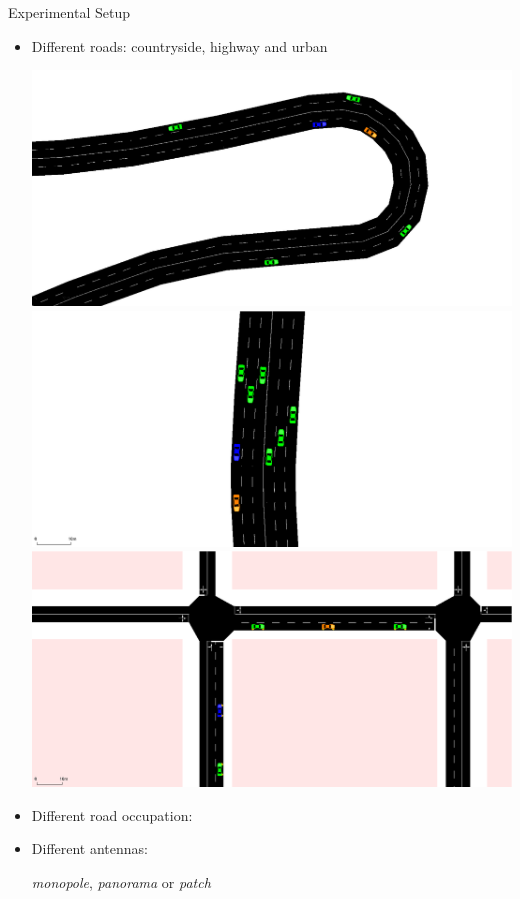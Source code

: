 \documentclass[aspectratio=169,12pt]{beamer}
\begin{document}
\begin{frame}{Experimental Setup}
  \begin{itemize}
  \item 
    Different roads: countryside, highway and urban
    \begin{center}
      \includegraphics[width=0.2\linewidth]{images/countryside.png}
      \includegraphics[width=0.2\linewidth]{images/highway.png}
      \includegraphics[width=0.2\linewidth]{images/grid_road.png}
    \end{center}

    \vspace{0.5em}
    
  \item Different road occupation:
    \begin{center}
    \end{center}

    \vspace{0.5em}

  \item Different antennas:
  \begin{center}
    \textit{monopole}, \textit{panorama} or \textit{patch}
  \end{center}
  \end{itemize}
\end{frame}
\end{document}
